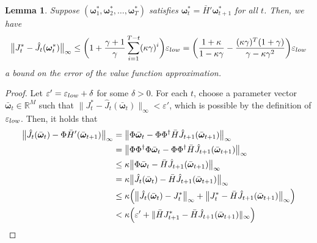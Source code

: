 \documentclass[11pt, notitlepage]{article}
\newcommand{\R}{\mathbb{R}}
\newcommand{\1}{\mathbbm{1}}
\newtheorem{lemma}{Lemma}[section]
\begin{document}
    
\begin{lemma} \label{lemma.lower_w_bellman}
    Suppose $(\boldsymbol{\omega}_1^*, \boldsymbol{\omega}_2^*, \ldots, \boldsymbol{\omega}_{T}^*)$ satisfies $\boldsymbol{\omega}_t^* = \bar{H}' \boldsymbol{\omega}_{t+1}^*$ for all $t$. Then, we have
    \begin{equation*}
        \bigl \|J_t^* - \hat{J}_t(\boldsymbol{\omega}_t^*) \bigr\|_\infty
        \leq \biggl(1 + \frac{\gamma+1}{\gamma} \sum_{i=1}^{T-t}(\kappa\gamma)^i\biggr) \varepsilon_{\textnormal{low}} = \biggl(\frac{1+\kappa}{1-\kappa\gamma} - \frac{(\kappa\gamma)^T(1+\gamma)}{\gamma-\kappa\gamma^2}\biggr) \varepsilon_{\textnormal{low}}
    \end{equation*}
    a bound on the error of the value function approximation.
\end{lemma}
\begin{proof}
Let $\varepsilon' = \varepsilon_{\textnormal{low}} + \delta$ for some $\delta>0$. For each $t$, choose a parameter vector $\bar{\boldsymbol{\omega}}_t \in \R^M$ such that $\|J_t^* - \hat{J}_t(\bar{\boldsymbol{\omega}}_t)\|_\infty < \varepsilon'$, which is possible by the definition of $\varepsilon_{\textnormal{low}}$. Then, it holds that
    \begin{align}
        \bigl \|\hat{J}_t(\bar{\boldsymbol{\omega}}_t) - \Phi \bar{H}' (\bar{\boldsymbol{\omega}}_{t+1}) \bigr\|_\infty
        &= \bigl \|\Phi \bar{\boldsymbol{\omega}}_t - \Phi \Phi^{\dagger} \bar{H} \hat{J}_{t+1}(\bar{\boldsymbol{\omega}}_{t+1})\bigr\|_\infty \nonumber\\
        &= \bigl \|\Phi \Phi^{\dagger} \Phi \bar{\boldsymbol{\omega}}_t - \Phi \Phi^{\dagger} \bar{H} \hat{J}_{t+1}(\bar{\boldsymbol{\omega}}_{t+1}) \bigr\|_\infty \nonumber\\
        &\leq \kappa \bigl \|\Phi \bar{\boldsymbol{\omega}}_t - \bar{H} \hat{J}_{t+1}(\bar{\boldsymbol{\omega}}_{t+1}) \bigr\|_\infty \label{eq.apply_phi_phi_dagger_lower}\\
        &= \kappa \bigl \|\hat{J}_t(\bar{\boldsymbol{\omega}}_t) - \bar{H} \hat{J}_{t+1}(\bar{\boldsymbol{\omega}}_{t+1}) \bigr\|_\infty \nonumber\\
        &\leq\kappa \Bigl( \bigl \|\hat{J}_t(\bar{\boldsymbol{\omega}}_t) - J_t^* \bigr\|_\infty + \bigl\|J_t^* - \bar{H} \hat{J}_{t+1}(\bar{\boldsymbol{\omega}}_{t+1})\bigr\|_\infty \Bigr) \nonumber\\
        &< \kappa\Bigl(\varepsilon' + \|\bar{H} J_{t+1}^* - \bar{H} \hat{J}_{t+1}(\bar{\boldsymbol{\omega}}_{t+1})\|_\infty \Bigr)\nonumber\\

\end{align}
\end{proof}
\end{document}
